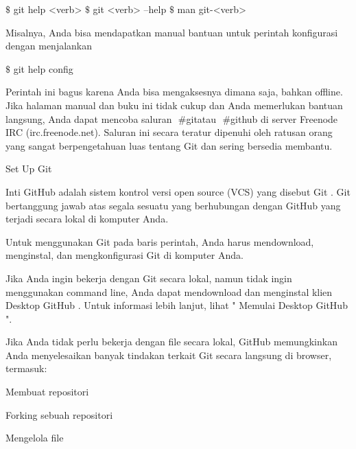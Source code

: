 \vspace{12pt}
\noindent 
 $  \$  $ git help <verb>  $  \$  $ git <verb> --help  $  \$  $ man git-<verb>  \par
\vspace{12pt}
\noindent 
Misalnya, Anda bisa mendapatkan manual bantuan untuk perintah konfigurasi dengan menjalankan \par
\vspace{12pt}
\noindent 
  $  \$  $ git help config  \par
\vspace{12pt}
\noindent 
Perintah ini bagus karena Anda bisa mengaksesnya dimana saja, bahkan offline. $  $Jika halaman manual dan buku ini tidak cukup dan Anda memerlukan bantuan langsung, Anda dapat mencoba saluran $  $ $  \#  $gitatau $  $ $  \#  $github $  $di server Freenode IRC (irc.freenode.net). $  $Saluran ini secara teratur dipenuhi oleh ratusan orang yang sangat berpengetahuan luas tentang Git dan sering bersedia membantu. \par
\vspace{12pt}
\noindent 
Set Up Git \par
\vspace{12pt}
\noindent 
Inti GitHub adalah sistem kontrol versi open source (VCS) yang disebut $  $Git $  $. $  $Git bertanggung jawab atas segala sesuatu yang berhubungan dengan GitHub yang terjadi secara lokal di komputer Anda. \par
\vspace{12pt}
\noindent 
Untuk menggunakan Git pada baris perintah, Anda harus mendownload, menginstal, dan mengkonfigurasi Git di komputer Anda. \par
\vspace{12pt}
\noindent 
Jika Anda ingin bekerja dengan Git secara lokal, namun tidak ingin menggunakan command line, Anda dapat mendownload dan menginstal klien $  $Desktop GitHub $  $. $  $Untuk informasi lebih lanjut, lihat " $  $Memulai Desktop GitHub $  $". \par
\vspace{12pt}
\noindent 
Jika Anda tidak perlu bekerja dengan file secara lokal, GitHub memungkinkan Anda menyelesaikan banyak tindakan terkait Git secara langsung di browser, termasuk: \par
\vspace{12pt}
\noindent 
Membuat repositori \par
\noindent 
Forking sebuah repositori \par
\noindent 
Mengelola file \par
